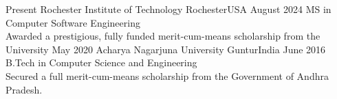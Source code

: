 %
%
%
\begin{experiences}
    \experience
    {Present}   {Rochester Institute of Technology}
    {Rochester}{USA}
    {August 2024} {MS in Computer Software Engineering \\
                    Awarded a prestigious, fully funded merit-cum-means scholarship from the University
                    }{}
    \emptySeparator
    \experience
    {May 2020}   {Acharya Nagarjuna University}
    {Guntur}{India}
    {June 2016} {B.Tech in Computer Science and Engineering \\
                    Secured a full merit-cum-means scholarship from the Government of Andhra Pradesh.
                    }{}
    
   
\end{experiences}
